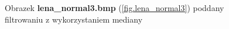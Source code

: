 \documentclass{classrep}
\begin{document}
\begin{figure}
{{  \label{fig.lena_normal3_median_5x5}
 }
}
\caption{Obrazek \textbf{lena\_normal3.bmp} (\ref{fig.lena_normal3}) poddany filtrowaniu z wykorzystaniem mediany}
\label{fig.lena_normal3_median}
\end{figure}
\end{document}
